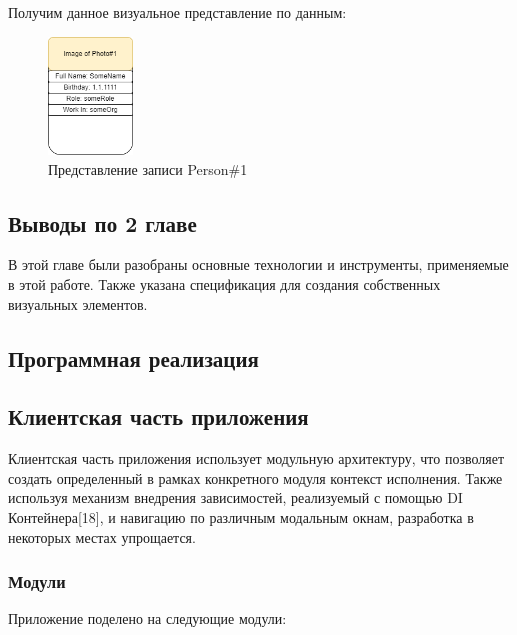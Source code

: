\documentclass[12pt]{article}
\begin{document}
Получим данное визуальное представление по данным:

\begin{figure}[!ht]
    \centering
    \includegraphics[width=0.2\textwidth]{_images/rdf_vis_result.png}
    \caption*{Представление записи Person\#1}
\end{figure}

\subsection{Выводы по 2 главе}
В этой главе были разобраны основные технологии и инструменты, применяемые в этой работе. Также указана спецификация для создания собственных визуальных элементов.

\pagebreak

\begin{center}
    {\section{Программная реализация}}
\end{center}

\subsection{Клиентская часть приложения}
\qquad Клиентская часть приложения использует модульную архитектуру, что позволяет создать определенный в рамках конкретного модуля контекст исполнения. Также используя механизм внедрения зависимостей, реализуемый с помощью DI Контейнера[18], и навигацию по различным модальным окнам, разработка в некоторых местах упрощается.

\subsubsection{Модули}
\qquad Приложение поделено на следующие модули:
\end{document}

